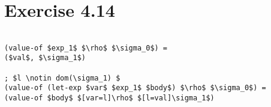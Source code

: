 \section*{Exercise 4.14}

\begin{center}
\begin{lstlisting}[mathescape]

(value-of $exp_1$ $\rho$ $\sigma_0$) =
($val$, $\sigma_1$)

; $l \notin dom(\sigma_1) $
(value-of (let-exp $var$ $exp_1$ $body$) $\rho$ $\sigma_0$) =
(value-of $body$ $[var=l]\rho$ $[l=val]\sigma_1$)


\end{lstlisting}
\end{center}
